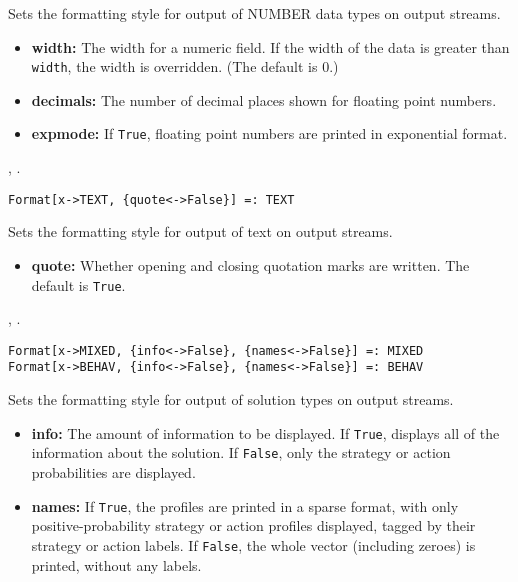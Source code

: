 \noindent
Sets the formatting style for output of NUMBER data types on output streams.
\begin{itemize}
\item \textbf{width:} The width for a numeric field.  If the width of the
data is greater than \verb+width+, the width is overridden.  (The
default is 0.)
\item \textbf{decimals:} The number of decimal places shown for floating point
numbers.
\item \textbf{expmode:} If \verb+True+, floating point numbers are printed in
exponential format.
\end{itemize}

\seealso {},
.

\latexignore{\hrule}

\begin{verbatim}
Format[x->TEXT, {quote<->False}] =: TEXT 
\end{verbatim}

\noindent
Sets the formatting style for output of text on output streams.
\begin{itemize}
\item \textbf{quote:} Whether opening and closing quotation marks are
written.  The default is \verb+True+.  
\end{itemize}

\seealso {},
.

\latexignore{\hrule}

\begin{verbatim}
Format[x->MIXED, {info<->False}, {names<->False}] =: MIXED
Format[x->BEHAV, {info<->False}, {names<->False}] =: BEHAV
\end{verbatim}

\noindent
Sets the formatting style for output of solution types on output streams.
\begin{itemize}
\item \textbf{info:} The amount of information to be displayed.  If \verb+True+,
displays all of the information about the solution.  If \verb+False+,
only the strategy or action probabilities are displayed.
\item \textbf{names:} If \verb+True+, the profiles are printed in a sparse format,
with only positive-probability strategy or action profiles displayed, tagged
by their strategy or action labels.  If \verb+False+, the whole vector
(including zeroes) is printed, without any labels.
\end{itemize}

